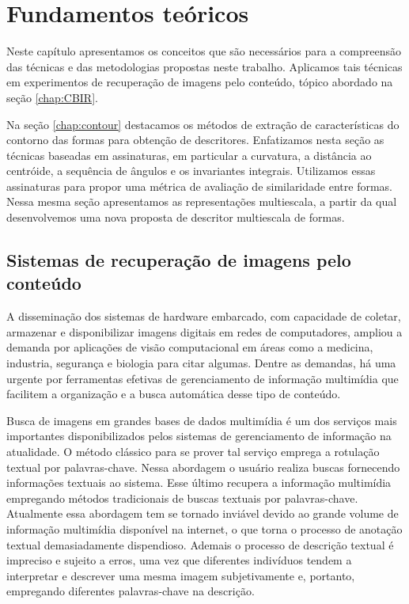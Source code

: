 \chapter{Fundamentos teóricos}

Neste capítulo apresentamos os conceitos que são necessários para a compreensão das técnicas e das metodologias propostas neste trabalho. Aplicamos tais técnicas em experimentos de recuperação de imagens pelo conteúdo, tópico abordado na seção \ref{chap:CBIR}.

Na seção \ref{chap:contour} destacamos os métodos de extração de características do contorno das formas para obtenção de descritores. Enfatizamos nesta seção as técnicas baseadas em assinaturas, em particular a curvatura, a distância ao centróide, a sequência de ângulos e os invariantes integrais. Utilizamos essas assinaturas para propor uma métrica de avaliação de similaridade entre formas. Nessa mesma seção apresentamos as representações multiescala, a partir da qual desenvolvemos uma nova proposta de descritor multiescala de formas.


\section{\label{chap:CBIR} Sistemas de recuperação de imagens pelo conteúdo}

A disseminação dos sistemas de hardware embarcado, com capacidade de coletar, armazenar e disponibilizar imagens digitais em redes de computadores, ampliou a demanda por aplicações de visão computacional em áreas como a medicina, industria, segurança e biologia para citar algumas. Dentre as demandas, há uma urgente por ferramentas efetivas de gerenciamento de informação multimídia que facilitem a organização e a busca automática desse tipo de conteúdo. 

Busca de imagens em grandes bases de dados multimídia é um dos serviços mais importantes disponibilizados pelos sistemas de gerenciamento de informação na atualidade. O método clássico para se prover tal serviço emprega a rotulação textual por palavras-chave. Nessa abordagem o usuário realiza buscas fornecendo informações textuais ao sistema. Esse último recupera a informação multimídia empregando métodos tradicionais de buscas textuais por palavras-chave. Atualmente essa abordagem tem se tornado inviável devido ao grande volume de informação multimídia disponível na internet, o que torna o processo de anotação textual demasiadamente dispendioso. Ademais o processo de descrição textual é impreciso e sujeito a erros, uma vez que diferentes indivíduos tendem a interpretar e descrever uma mesma imagem subjetivamente e, portanto, empregando diferentes palavras-chave na descrição.

